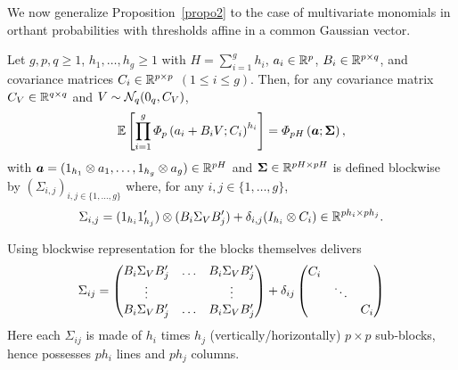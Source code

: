 We now generalize Proposition~\ref{propo2} to the case of multivariate monomials in orthant probabilities with thresholds affine in a common Gaussian vector.

\begin{propo}
    \label{propo3}
Let $g, p, q\geq 1$, $h_{1},\dots, h_{g}\geq 1$ with $H=\sum_{i=1}^g h_i$, $a_{i} \in \mathbb{R}^{p}$, $B_{i}\in \mathbb{R}^{p \times q}$, and covariance matrices $C_i \in \mathbb{R}^{p \times p}$ $(1\leq i \leq g)$. Then, for any covariance matrix $C_{V} \in \mathbb{R}^{q\times q}$ and $V\sim\mathcal{N}_{q}(0_q,C_{V})$,
    \begin{equation}
    \mathbb{E}\left[ \prod_{i=1}^{g} \varPhi_{p}\left(a_i + B_{i}V; \covN_{i} \right)^{h_i} \right]
    =
\varPhi_{p H}
\left(
    \bm{a}
;
\mathbf{\Sigma}
\right),
\end{equation}
with $\bm{a}=(1_{h_1}\otimes a_1, \dots, 1_{h_g}\otimes a_{g}) \in \mathbb{R}^{p H}$
and $\mathbf{\Sigma}\in \mathbb{R}^{p H \times p H}$ is defined blockwise by $(\Sigma_{i,j})_{i,j \in \{1,\dots, g\}}$ where, for any $i,j \in \{1,\dots, g\}$, %
\begin{equation}
\Sigma_{i,j}=
(1_{h_{i}}1_{h_{j}}')\otimes (B_{i}\Sigma_{V} B_{j}') + \delta_{i,j}(I_{h_{i}}\otimes \covN_{i}) \in \R^{p h_{i} \times p h_{j}}.
\end{equation}
\end{propo}

\begin{remark}
Using blockwise representation for the blocks themselves delivers %
\begin{equation*}
\Sigma_{ij} =
\begin{pmatrix}
B_i\Sigma_{V} B_j' & \dots & B_i\Sigma_{V} B_j'\\
\vdots & & \vdots\\
B_i\Sigma_{V} B_j' & \dots & B_i\Sigma_{V} B_j'\\
\end{pmatrix}
+
\delta_{ij}
\begin{pmatrix}
    \covN_i & &\\
        & \ddots &\\
        &   & \covN_i
\end{pmatrix}%
\end{equation*}
Here each $\Sigma_{ij}$ is made of $h_i$ times $h_j$
(vertically/horizontally) $p \times p$ sub-blocks, hence possesses $ph_i$ lines and $ph_j$ columns.
\end{remark}

